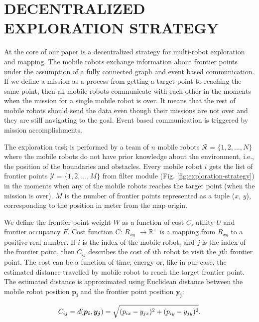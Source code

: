 \section{DECENTRALIZED EXPLORATION STRATEGY} 

At the core of our paper is a decentralized strategy for multi-robot exploration and mapping. The mobile robots exchange information about frontier points under the assumption of a fully connected graph and event based communication. If we define a mission as a process from getting a target point to reaching the same point, then all mobile robots communicate with each other in the moments when the mission for a single mobile robot is over. It means that the rest of mobile robots should send the data even though their missions are not over and they are still navigating to the goal. Event based communication is triggered by mission accomplishments.   

The exploration task is performed by a team of $n$ mobile robots  \(\text{$\mathcal {R}$}\) = $ \{ 1, 2,..., N\}$ where the mobile robots do not have prior knowledge about the environment, i.e., the position of the boundaries and obstacles.  
Every mobile robot $i$ gets the list of frontier points  \(\text{$\mathcal {Y}$}\) = $ \{ 1, 2,..., M\}$ from filter module (Fig. \ref{fig:exploration-strategy}) in the moments when any of the mobile robots reaches the target point (when the mission is over). $M$ is the number of frontier points represented as a tuple ($x$, $y$), corresponding to the position in meter from the map origin. 

We define the frontier point weight $W$ as a function of cost $C$, utility $U$ and frontier occupancy $F$. Cost function $C$: $R_{xy}$ \(\rightarrow \text{$\mathbb{R}^{+}$}\) is a mapping from $R_{xy}$ to a positive real number.  If $i$ is the index of the mobile robot, and $j$ is the index of the frontier point, then $C_{ij}$ describes the cost of $i$th robot to visit the $j$th frontier point. The cost can be a function of time, energy or, like in our case, the estimated distance travelled by mobile robot to reach the target frontier point. The estimated distance is approximated using Euclidean distance between the mobile robot position $\boldsymbol{p_{i}}$ and the frontier point position $\boldsymbol{y_{j}}$:

\begin{equation}\small
    C_{ij}=d(\boldsymbol{p_{i}}, \boldsymbol{y_{j}}) = \sqrt{(p_{ix}-y_{jx})^{2}+(p_{iy}-y_{jy})^{2}}.
    \label{cost}
\end{equation}

